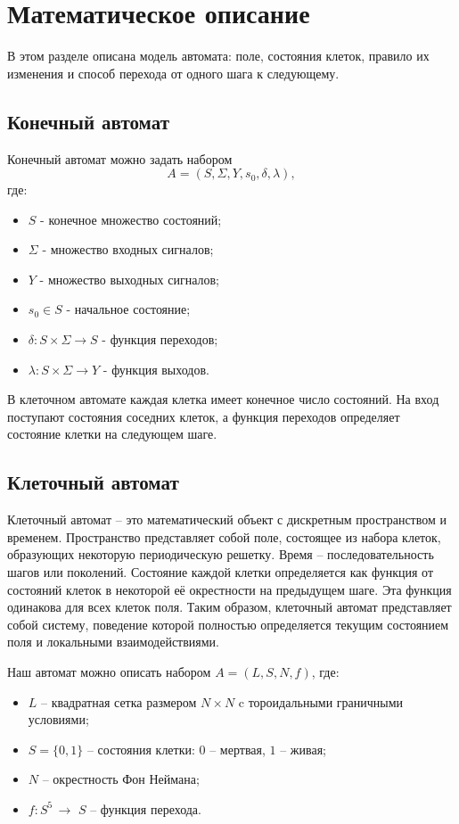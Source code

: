 \section{Математическое описание}

В этом разделе описана модель автомата: поле, состояния клеток, правило их
изменения и способ перехода от одного шага к следующему.

\subsection{Конечный автомат}

Конечный автомат можно задать набором
\[
    A = (S, \Sigma, Y, s_0, \delta, \lambda),
\]
где:
\begin{itemize}
    \item $S$ - конечное множество состояний;
    \item $\Sigma$ - множество входных сигналов;
    \item $Y$ - множество выходных сигналов;
    \item $s_0 \in S$ - начальное состояние;
    \item $\delta: S \times \Sigma \to S$ - функция переходов;
    \item $\lambda: S \times \Sigma \to Y$ - функция выходов.
\end{itemize}

В клеточном автомате каждая клетка имеет конечное число состояний. На вход
поступают состояния соседних клеток, а функция переходов определяет
состояние клетки на следующем шаге.

\subsection{Клеточный автомат}

Клеточный автомат – это математический объект с дискретным
пространством и временем. Пространство представляет собой поле,
состоящее из набора клеток, образующих некоторую периодическую
решетку. Время – последовательность шагов или поколений. Состояние
каждой клетки определяется как функция от состояний клеток в некоторой её
окрестности на предыдущем шаге. Эта функция одинакова для всех клеток
поля. Таким образом, клеточный автомат представляет собой систему,
поведение которой полностью определяется текущим состоянием поля и
локальными взаимодействиями.


Наш автомат можно описать набором $A = (L, S, N, f)$, где:

\begin{itemize}
    \item $L$ -- квадратная сетка размером $N \times N$ c тороидальными граничными условиями;
    \item $S = \{0, 1\}$ -- состояния клетки: $0$ -- мертвая, $1$ -- живая;
    \item $N$ -- окрестность Фон Неймана;
    \item $f: S^5 \, → \,\, S$ -- функция перехода.
\end{itemize}

